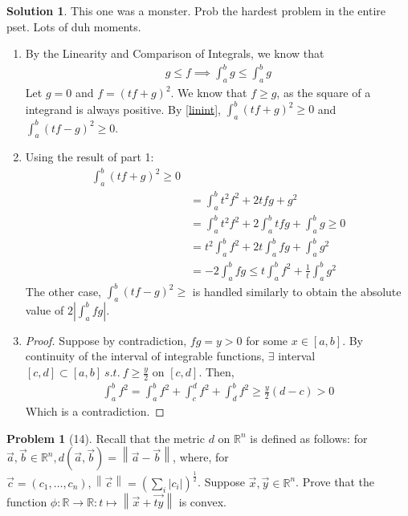 \documentclass[12pt]{article}
\theoremstyle{definition} %
\newtheorem{solution}{Solution}
\newtheorem{problem}{Problem}
\theoremstyle{plain} %
\begin{document}
\begin{solution}
    This one was a monster. Prob the hardest problem in the entire pset. Lots of duh moments.
    \begin{enumerate}
        \item By the Linearity and Comparison of Integrals, we know that 
        \begin{align}
            g\leq f \implies \int_{a}^{b} g \leq \int_{a}^{b} g \label{linint}   
        \end{align}
        Let $g=0$ and $f = (tf+g)^{2}$. We know that $f\geq g$, as the square of a integrand is always positive. By \autoref{linint}, $\int_{a}^{b} (tf+g)^{2}  \geq 0$ and $\int_{a}^{b} (tf-g)^{2}\geq 0 $.    
        \item Using the result of part 1:
        \begin{align}
            \int_{a}^{b} (tf+g)^{2} \geq 0\\[10pt]  
            &= \int_{a}^{b} t^{2}f^{2} + 2tfg + g^{2} \\[10pt] 
            &= \int_{a}^{b} t^{2}f^{2} + 2\int_{a}^{b} tfg + \int_{a}^{b} g \geq 0 \\[10pt] 
            &= t^{2}\int_{a}^{b} f^{2} + 2t\int_{a}^{b} fg + \int_{a}^{b} g^{2} \\[10pt] 
            &= -2\int_{a}^{b} fg \leq t\int_{a}^{b} f^{2} + \frac{1}{t}\int_{a}^{b} g^{2}         
        \end{align}
        The other case, $\int_{a}^{b} (tf-g)^{2}\geq  $ is handled similarly to obtain the absolute value of $2\left\vert \int_{a}^{b} fg   \right\vert $.
        \item \begin{proof}
            Suppose by contradiction, $fg=y>0$ for some $x\in[a,b]$. By continuity of the interval of integrable functions, $\exists $ interval $[c,d] \subset [a,b]\ s.t. \ f\geq \frac{y}{2}$ on $[c,d]$. Then,
        \begin{align}
            \int_{a}^{b} f^{2} = \int_{a}^{b} f^{2}+\int_{c}^{d} f^{2}+\int_{d}^{b} f^{2}\geq \frac{y}{2}(d-c)>0         
        \end{align}  
            Which is a contradiction.
        \end{proof}
    \end{enumerate}
\end{solution}
\begin{problem}[14]
   Recall that the metric $d$ on $\mathbb{{R}}^{n}$ is defined as follows: for $\vec{a}, \vec{b}\in \mathbb{{R}}^{n}, d(\vec{a},\vec{b})=\left\lVert \vec{a} -\vec{b} \right\rVert $, where, for $\vec{c}=(c_1, \ldots , c_{n}),\left\lVert \vec{c} \right\rVert =\left( \sum_{i} \left\vert c_i \right\vert  \right)^{\frac{1}{2}}  $. Suppose $\vec{x}, \vec{y} \in \mathbb{{R}}^{n}$. Prove that the function $\phi:\mathbb{{R}}\to \mathbb{{R}}:t \mapsto \left\lVert \vec{x} +\vec{ty} \right\rVert $ is convex.     
\end{problem}
\end{document}
